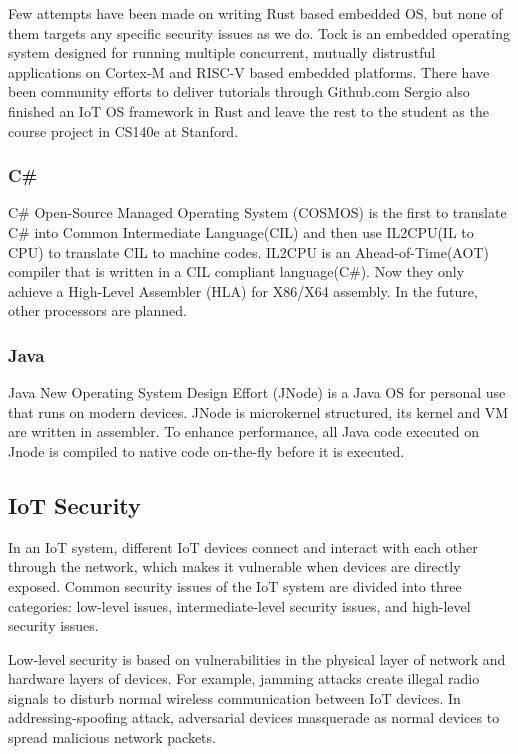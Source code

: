 Few attempts have been made on writing Rust based embedded OS, but none of them targets any specific security issues as we do.
Tock\cite{levy2015ownership, levy2017tock, levy2017multiprogramming} is an embedded operating system designed for running multiple concurrent, mutually distrustful applications on Cortex-M and RISC-V based embedded platforms.
There have been community efforts to deliver tutorials through Github.com\cite{rpi-os-t0, rpi-os-t1}
Sergio also finished an IoT OS framework in Rust\cite{cs140e} and leave the rest to the student as the course project in CS140e at Stanford.

\subsubsection{C\#}

C\# Open-Source Managed Operating System (COSMOS) \cite{cosmos} is the first to translate C\# into Common Intermediate Language(CIL) and then use IL2CPU(IL to CPU) to translate CIL to machine codes.
IL2CPU is an Ahead-of-Time(AOT) compiler that is written in a CIL compliant language(C\#). 
Now they only achieve a High-Level Assembler (HLA) for X86/X64 assembly. In the future, other processors are planned.

\subsubsection{Java}

Java New Operating System Design Effort (JNode)\cite{jnode} is a Java OS for personal use that runs on modern devices.
JNode is microkernel structured, its kernel and VM are written in assembler. 
To enhance performance, all Java code executed on Jnode is compiled to native code on-the-fly before it is executed. 

\subsection{IoT Security}

In an IoT system, different IoT devices connect and interact with each other through the network, which makes it vulnerable when devices are directly exposed. 
Common security issues of the IoT system are divided into three categories: low-level issues, intermediate-level security issues, and high-level security issues.

Low-level security is based on vulnerabilities in the physical layer of network and hardware layers of devices. 
For example, jamming attacks create illegal radio signals to disturb normal wireless communication between IoT devices\cite{xu2005feasibility,noubir2003low}. 
In addressing-spoofing attack, adversarial devices masquerade as normal devices to spread malicious network packets\cite{chen2007detecting}.

